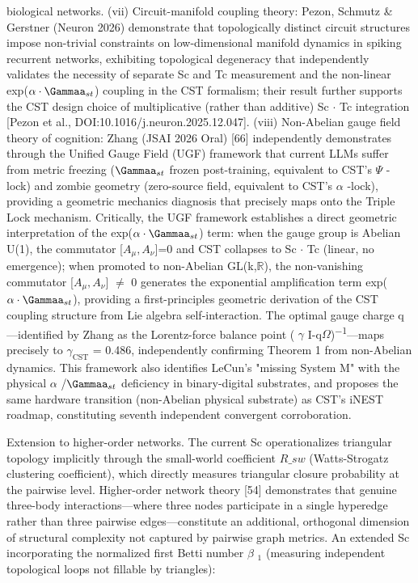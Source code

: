 \documentclass[a4paper,12pt]{article}
\providecommand{\textsubscript}[1]{\ensuremath{_{\text{#1}}}}
\begin{document}
biological networks. (vii) Circuit-manifold coupling theory: Pezon, Schmutz & Gerstner (Neuron 2026) demonstrate that topologically distinct circuit structures impose non-trivial constraints on low-dimensional manifold dynamics in spiking recurrent networks, exhibiting topological degeneracy that independently validates the necessity of separate Sc and Tc measurement and the non-linear
exp($\alpha \cdot \Gammaa_{st}$) coupling in the CST formalism; their result further supports the CST design choice of multiplicative (rather than additive) Sc $\cdot$ Tc integration [Pezon et al., DOI:10.1016/j.neuron.2025.12.047]. (viii) Non-Abelian gauge field theory of cognition: Zhang (JSAI 2026 Oral) [66] independently demonstrates through the Unified Gauge Field (UGF) framework that current
LLMs suffer from metric freezing ($\Gammaa_{st}$ frozen post-training, equivalent to CST's  $\Psi$ -lock) and zombie geometry (zero-source field, equivalent to CST's  $\alpha$ -lock), providing a geometric mechanics diagnosis that precisely maps onto the Triple Lock mechanism.
Critically, the UGF framework establishes a direct geometric interpretation of the exp($\alpha \cdot \Gammaa_{st}$) term: when the gauge group is Abelian U(1), the commutator [$A_{\mu}, A_{\nu}$]=0 and CST collapses to Sc $\cdot$ Tc (linear, no emergence); when promoted to non-Abelian GL(k,$\mathbb{R}$), the non-vanishing commutator [$A_{\mu}, A_{\nu}$] $\neq$ 0 generates the exponential amplification term
exp($\alpha \cdot \Gammaa_{st}$), providing a first-principles geometric derivation of the CST coupling structure from Lie algebra self-interaction.
The optimal gauge charge q---identified by Zhang as the Lorentz-force balance point ( $\gamma$ I-q$\Omega$)\textsuperscript{$-$}\textsuperscript{1}---maps precisely to $\gamma_{\text{CST}}$ = 0.486, independently confirming Theorem 1 from non-Abelian dynamics.
This framework also identifies LeCun's "missing System M" with the physical  $\alpha$ /$\Gammaa_{st}$ deficiency in binary-digital substrates, and proposes the same hardware transition (non-Abelian physical substrate) as CST's iNEST roadmap, constituting seventh independent convergent corroboration.

Extension to higher-order networks.
The current Sc operationalizes triangular topology implicitly through the small-world coefficient $R\_{sw}$ (Watts-Strogatz clustering coefficient), which directly measures triangular closure probability at the pairwise level.
Higher-order network theory [54] demonstrates that genuine three-body interactions---where three nodes participate in a single hyperedge rather than three pairwise edges---constitute an additional, orthogonal dimension of structural complexity not captured by pairwise graph metrics.
An extended Sc incorporating the normalized first Betti number  $\beta$ \textsubscript{1} (measuring independent topological loops not fillable by triangles):
\end{document}
